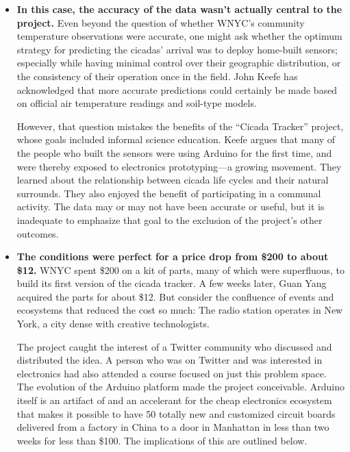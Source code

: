 \begin{itemize}
\item \textbf{In this case, the accuracy of the data wasn't actually central to
the project.}
Even beyond the question of whether WNYC's community temperature
observations were accurate, one might ask whether the optimum
strategy for predicting the cicadas' arrival was to deploy home-built
sensors; especially while having minimal control over their geographic
distribution, or the consistency of their operation once in the
field. John Keefe has acknowledged that more accurate predictions
could certainly be made based on official air temperature readings
and soil-type models.

However, that question mistakes the benefits of the ``Cicada Tracker''
project, whose goals included informal science education. Keefe
argues that many of the people who built the sensors were using
Arduino for the first time, and were thereby exposed to electronics
prototyping—a growing movement. They learned about the relationship
between cicada life cycles and their natural surrounds. They also
enjoyed the benefit of participating in a communal activity. The data
may or may not have been accurate or useful, but it is inadequate to
emphasize that goal to the exclusion of the project's other outcomes.

\item \textbf{The conditions were perfect for a price drop from \$200 to
about \$12.}
WNYC spent \$200 on a kit of parts, many of which were superfluous,
to build its first version of the cicada tracker. A few weeks later, Guan
Yang acquired the parts for about \$12. But consider the confluence
of events and ecosystems that reduced the cost so much: The radio
station operates in New York, a city dense with creative technologists.

The project caught the interest of a Twitter community who
discussed and distributed the idea. A person who was on Twitter and
was interested in electronics had also attended a course focused on
just this problem space. The evolution of the Arduino platform made
the project conceivable. Arduino itself is an artifact of and an accelerant
for the cheap electronics ecosystem that makes it possible to have
50 totally new and customized circuit boards delivered from a factory
in China to a door in Manhattan in less than two weeks for less than
\$100. The implications of this are outlined below.
\end{itemize}

